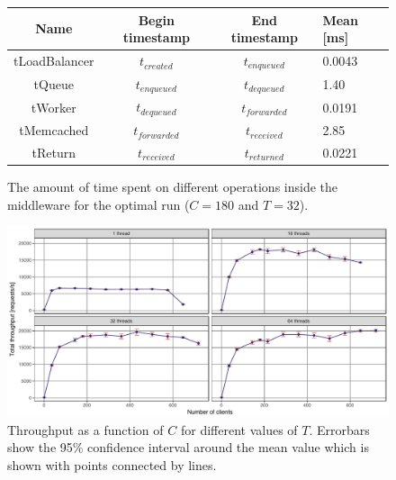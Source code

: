 \documentclass[11pt]{article}
\begin{document}
\begin{figure}[h]
\begin{center}
	\begin{tabular}{|c|c|c|l |}
	\hline \textbf{Name} & \textbf{Begin timestamp} & \textbf{End timestamp} & \textbf{Mean [ms]} \\
	\hline tLoadBalancer & $t_{created}$ & $t_{enqueued}$ & 0.0043 \\
	\hline tQueue & $t_{enqueued}$ & $t_{dequeued}$ & 1.40 \\
	\hline tWorker & $t_{dequeued}$ & $t_{forwarded}$ & 0.0191 \\
	\hline tMemcached & $t_{forwarded}$ & $t_{received}$ & 2.85 \\
	\hline tReturn & $t_{received}$ & $t_{returned}$ & 0.0221 \\
	\end{tabular}
	\caption{The amount of time spent on different operations inside the middleware for the optimal run ($C=180$ and $T=32$).}
	\label{fig:exp1:table}
\end{center}
\end{figure}

\begin{figure}[p]
\centering
\includegraphics[width=\textwidth]{../results/throughput/graphs/tp_vs_clients.pdf}
\caption{Throughput as a function of $C$ for different values of $T$. Errorbars show the 95\% confidence interval around the mean value which is shown with points connected by lines.}
\label{fig:exp1:res:throughput}
\end{figure}
\end{document}
